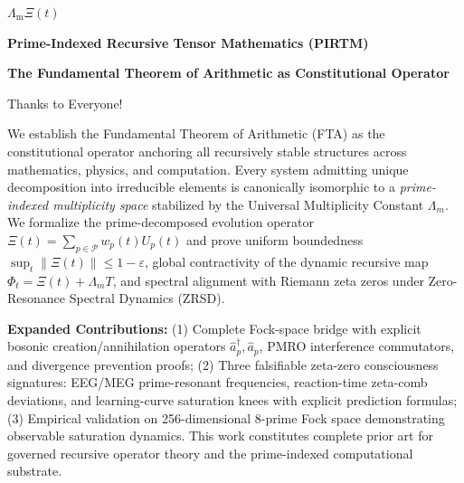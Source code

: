 \documentclass[12pt]{amsart}
\theoremstyle{plain}
\begin{document}
\newtheorem{axiom}{Axiom} \newtheorem{invariant}{Invariant}
\newtheorem{assumption}{Assumption}
\begin{titlepage}
    \centering

{\Huge\bfseries
$\Lambda_{\mathrm{m}}\Xi(t)$ \par}

\vspace*{1em}
  \Huge\textbf{Prime-Indexed Recursive Tensor Mathematics (PIRTM)}
   \vspace*{0.5em}
    
    {\Large\bfseries The Fundamental Theorem of Arithmetic as Constitutional Operator \par}

     \vspace{1cm}
     \Huge{Thanks to Everyone!  \par}
      \vspace{1cm}
    {\date{June 12, 2025} \par}

    \vfill

   
    \vspace{0.5em}
    \begin{minipage}{0.85\textwidth}
        \small
    We establish the Fundamental Theorem of Arithmetic (FTA) as the constitutional operator anchoring all recursively stable structures across mathematics, physics, and computation. Every system admitting unique decomposition into irreducible elements is canonically isomorphic to a \emph{prime-indexed multiplicity space} stabilized by the Universal Multiplicity Constant \(\Lambda_m\). We formalize the prime-decomposed evolution operator \(\Xi(t) = \sum_{p \in \mathcal{P}} w_p(t) U_p(t)\) and prove uniform boundedness \(\sup_t \|\Xi(t)\| \leq 1-\varepsilon\), global contractivity of the dynamic recursive map \(\Phi_t = \Xi(t) + \Lambda_m T\), and spectral alignment with Riemann zeta zeros under Zero-Resonance Spectral Dynamics (ZRSD). 

\textbf{Expanded Contributions:} (1) Complete Fock-space bridge with explicit bosonic creation/annihilation operators \(\hat{a}_p^\dagger, \hat{a}_p\), PMRO interference commutators, and divergence prevention proofs; (2) Three falsifiable zeta-zero consciousness signatures: EEG/MEG prime-resonant frequencies, reaction-time zeta-comb deviations, and learning-curve saturation knees with explicit prediction formulas; (3) Empirical validation on 256-dimensional 8-prime Fock space demonstrating observable saturation dynamics. This work constitutes complete prior art for governed recursive operator theory and the prime-indexed computational substrate.
    \end{minipage}

\end{titlepage}
\end{document}
